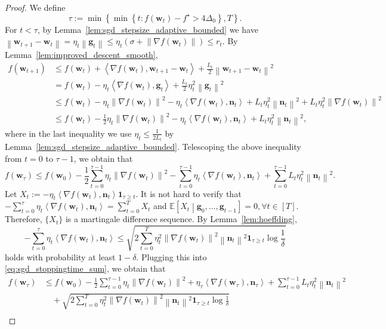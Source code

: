 \documentclass{article}
\newcommand{\Norm}[1]{\left\|#1\right\|}
\newcommand{\dotprod}[2]{\left\langle#1,#2\right\rangle}
\newcommand{\paren}[1]{\left( #1 \right)}
\newcommand{\bw}{\mathbf{w}}
\newcommand{\bn}{\mathbf{n}}
\newcommand{\bg}{\mathbf{g}}
\newcommand{\EE}{\mathbb{E}}
\begin{document}
\begin{proof}
    We define $$\tau:=\min\left\{\min\left\{t:f(\bw_t)-f^\star>4\Delta_0\right\}, T\right\}.$$
    For $t<\tau$, by Lemma~\ref{lem:sgd_stepsize_adaptive_bounded}  we have
    $\Norm{\bw_{t+1}-\bw_t}=\eta_t\Norm{\bg_t}\leq \eta_t\paren{\sigma+\Norm{\nabla f(\bw_t)}}\leq r_t$. By Lemma~\ref{lem:improved_descent_smooth}, 
    \begin{align*}
        f(\bw_{t+1})&\leq f(\bw_t)+\dotprod{\nabla f(\bw_t)}{\bw_{t+1}-\bw_t}+\frac{L_t}{2}\Norm{\bw_{t+1}-\bw_t}^2\\
        &= f(\bw_t)-\eta_t\dotprod{\nabla f(\bw_t)}{\bg_t}+\frac{L_t}{2}\eta_t^2\Norm{\bg_t}^2\\
        &\leq f(\bw_t)-\eta_t\Norm{\nabla f(\bw_t)}^2-\eta_t\dotprod{\nabla f(\bw_t)}{\bn_t}+L_t\eta_t^2\Norm{\bn_t}^2+L_t\eta_t^2\Norm{\nabla f(\bw_t)}^2\\
        &\leq f(\bw_t)-\frac{1}{2}\eta_t\Norm{\nabla f(\bw_t)}^2-\eta_t\dotprod{\nabla f(\bw_t)}{\bn_t}+L_t\eta_t^2\Norm{\bn_t}^2,
    \end{align*}
    where in the last inequality we use $\eta_t\leq\frac{1}{2L_t}$ by Lemma~\ref{lem:sgd_stepsize_adaptive_bounded}.
    Telescoping the above inequality from $t=0$ to $\tau-1$, we obtain that
    \begin{equation}\label{eq:sgd_stoppingtime_sum}
        f(\bw_\tau)\leq f(\bw_0)-\frac{1}{2}\sum_{t=0}^{\tau-1}\eta_t\Norm{\nabla f(\bw_t)}^2-\sum_{t=0}^{\tau-1}\eta_t\dotprod{\nabla f(\bw_t)}{\bn_t}+\sum_{t=0}^{\tau-1}L_t\eta_t^2\Norm{\bn_t}^2.
    \end{equation}
    Let $X_t:=-\eta_t\dotprod{\nabla f(\bw_t)}{\bn_t}\boldsymbol{1}_{\tau\geq t}$.
    It is not hard to verify that $-\sum_{t=0}^\tau\eta_t\dotprod{\nabla f(\bw_t)}{\bn_t}=\sum_{t=0}^T X_t$ and $\EE\left[X_t\middle|\bg_0,\dots,\bg_{t-1}\right]=0,\forall t\in[T]$. Therefore, $\{X_t\}$ is a martingale difference sequence. By Lemma~\ref{lem:hoeffding}, 
    $$-\sum_{t=0}^\tau\eta_t\dotprod{\nabla f(\bw_t)}{\bn_t}\leq \sqrt{2\sum_{t=0}^T\eta_t^2\Norm{\nabla f(\bw_t)}^2\Norm{\bn_t}^2\boldsymbol{1}_{\tau\geq t}\log\frac{1}{\delta}}$$
    holds with probability at least $1-\delta$.
    Plugging this into \eqref{eq:sgd_stoppingtime_sum}, we obtain that
    \begin{align*}
        f(\bw_\tau)&\leq f(\bw_0)-\frac{1}{2}\sum_{t=0}^{\tau-1}\eta_t\Norm{\nabla f(\bw_t)}^2+\eta_\tau\dotprod{\nabla f(\bw_\tau)}{\bn_\tau}+\sum_{t=0}^{\tau-1}L_t\eta_t^2\Norm{\bn_t}^2\\
        &\quad+\sqrt{2\sum_{t=0}^T\eta_t^2\Norm{\nabla f(\bw_t)}^2\Norm{\bn_t}^2\boldsymbol{1}_{\tau\geq t}\log\frac{1}{\delta}}\\

\end{align*}
\end{proof}
\end{document}
